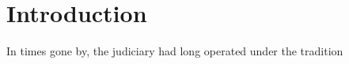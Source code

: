 \let\xn\xnote
\section{Introduction}

In times gone by, the judiciary had long operated under the tradition 









\newpage
